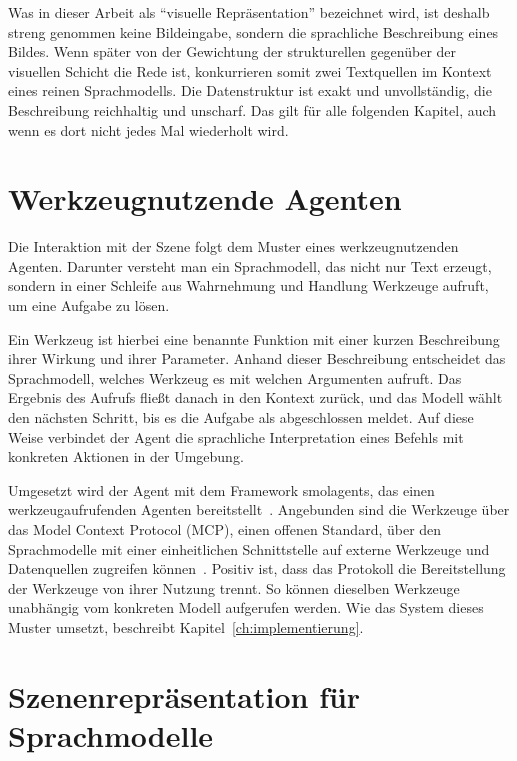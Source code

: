 Was in dieser Arbeit als \enquote{visuelle Repräsentation} bezeichnet wird, ist deshalb streng genommen keine Bildeingabe, sondern die sprachliche Beschreibung eines Bildes.
Wenn später von der Gewichtung der strukturellen gegenüber der visuellen Schicht die Rede ist, konkurrieren somit zwei Textquellen im Kontext eines reinen Sprachmodells.
Die Datenstruktur ist exakt und unvollständig, die Beschreibung reichhaltig und unscharf.
Das gilt für alle folgenden Kapitel, auch wenn es dort nicht jedes Mal wiederholt wird.


\section{Werkzeugnutzende Agenten}
\label{sec:grundlagen-agenten}

Die Interaktion mit der Szene folgt dem Muster eines werkzeugnutzenden Agenten.
Darunter versteht man ein Sprachmodell, das nicht nur Text erzeugt, sondern in einer Schleife aus Wahrnehmung und Handlung Werkzeuge aufruft, um eine Aufgabe zu lösen.

Ein Werkzeug ist hierbei eine benannte Funktion mit einer kurzen Beschreibung ihrer Wirkung und ihrer Parameter.
Anhand dieser Beschreibung entscheidet das Sprachmodell, welches Werkzeug es mit welchen Argumenten aufruft.
Das Ergebnis des Aufrufs fließt danach in den Kontext zurück, und das Modell wählt den nächsten Schritt, bis es die Aufgabe als abgeschlossen meldet.
Auf diese Weise verbindet der Agent die sprachliche Interpretation eines Befehls mit konkreten Aktionen in der Umgebung.

Umgesetzt wird der Agent mit dem Framework smolagents, das einen werkzeugaufrufenden Agenten bereitstellt~\cite{smolagents}.
Angebunden sind die Werkzeuge über das Model Context Protocol (MCP), einen offenen Standard, über den Sprachmodelle mit einer einheitlichen Schnittstelle auf externe Werkzeuge und Datenquellen zugreifen können~\cite{mcp}.
Positiv ist, dass das Protokoll die Bereitstellung der Werkzeuge von ihrer Nutzung trennt.
So können dieselben Werkzeuge unabhängig vom konkreten Modell aufgerufen werden.
Wie das System dieses Muster umsetzt, beschreibt Kapitel~\ref{ch:implementierung}.


\section[Szenenrepräsentation]{Szenenrepräsentation für Sprachmodelle}
\label{sec:grundlagen-repraesentation}

